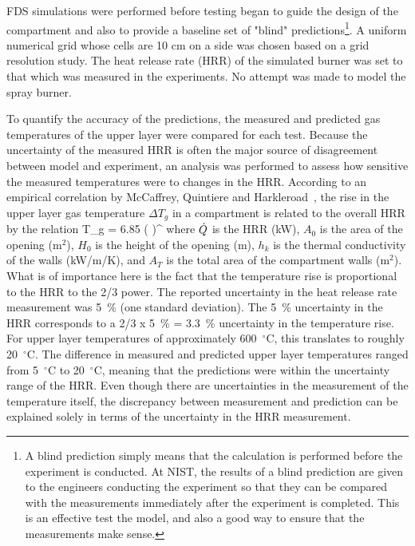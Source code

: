 FDS  simulations were  performed  before testing  began  to guide  the design  of the  compartment  and also  to  provide a  baseline set  of "blind"
predictions\footnote{A blind  prediction simply means that the calculation is performed before  the experiment is conducted. At NIST, the  results
of  a  blind  prediction  are  given  to  the  engineers conducting  the experiment  so  that  they can  be  compared with  the measurements
immediately after the experiment is completed. This is an effective  test the  model, and  also a  good way  to ensure  that the measurements make
sense.}.  A uniform numerical grid  whose cells are 10 cm on a side was chosen based on a grid resolution study.  The heat release rate (HRR)  of the
simulated burner was set  to that which was measured in  the experiments. No attempt  was made to  model the spray burner.

To  quantify  the  accuracy  of  the  predictions,  the  measured  and predicted gas temperatures  of the upper layer were  compared for each test.
Because the  uncertainty of the measured HRR  is often the major source of  disagreement between model and experiment,  an analysis was performed to
assess how sensitive  the measured temperatures  were to changes  in  the  HRR.   According  to  an  empirical  correlation  by McCaffrey,  Quintiere
and  Harkleroad~\cite{SFPE:Walton}, the  rise in the  upper layer  gas temperature  $\Delta  T_g$ in  a compartment  is related to  the overall HRR
by the  relation \be \Delta T_g  = 6.85 \; \left(     \right)^ \label{MQH} \ee
where $\dot{Q}$ is the HRR (kW), $A_0$ is the area of the opening (m$^2$), $H_0$ is the height of the opening (m),  $h_k$ is  the thermal  conductivity
of  the walls  (kW/m/K), and $A_T$ is the total area of  the compartment walls (m$^2$).  What is of importance here is the fact  that the temperature
rise is proportional to the  HRR to  the 2/3  power. The reported  uncertainty in  the heat release rate  measurement was 5~\% (one standard
deviation). The 5~\% uncertainty  in  the  HRR  corresponds  to  a  2/3  x  5~\%  =  3.3~\% uncertainty in the temperature  rise.  For upper layer
temperatures of approximately 600~$^\circ$C, this  translates to roughly 20~$^\circ$C. The  difference in  measured  and predicted  upper layer
temperatures ranged from 5~$^\circ$C to  20~$^\circ$C, meaning that the predictions were within the  uncertainty range of the HRR.   Even though
there are uncertainties  in  the  measurement  of the  temperature  itself,  the discrepancy between measurement and prediction can be explained
solely in terms of the uncertainty in the HRR measurement.

